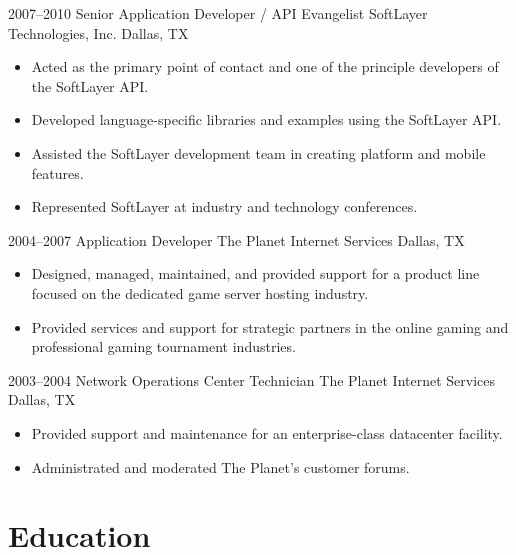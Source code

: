 \documentclass[11pt,a4paper,sans]{moderncv}
\begin{document}
        \cventry
            {2007--2010}
            {Senior Application Developer / API Evangelist}
            {SoftLayer Technologies, Inc.}
            {Dallas, TX}
            {}
            {
                \begin{itemize}
                    \item Acted as the primary point of contact and one of the principle developers of the SoftLayer API.
                    \item Developed language-specific libraries and examples using the SoftLayer API.
                    \item Assisted the SoftLayer development team in creating platform and mobile features.
                    \item Represented SoftLayer at industry and technology conferences.
                \end{itemize}
            }

        \cventry
            {2004--2007}
            {Application Developer}
            {The Planet Internet Services}
            {Dallas, TX}
            {}
            {
                \begin{itemize}
                    \item Designed, managed, maintained, and provided support for a product line focused on the dedicated game server hosting industry.
                    \item Provided services and support for strategic partners in the online gaming and professional gaming tournament industries.
                \end{itemize}
            }

        \cventry
            {2003--2004}
            {Network Operations Center Technician}
            {The Planet Internet Services}
            {Dallas, TX}
            {}
            {
                \begin{itemize}
                    \item Provided support and maintenance for an enterprise-class datacenter facility.
	            \item Administrated and moderated The Planet's customer forums.
                \end{itemize}
            }

    \section{Education}
\end{document}
